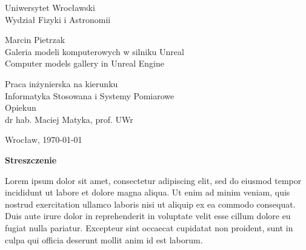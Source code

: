 \documentclass[a4paper,12pt,reqno]{article}
\begin{document}


\begin{center}

\thispagestyle{empty}

\Large 
Uniwersytet Wrocławski\\
Wydział Fizyki i Astronomii\\
\vspace{0.8cm}
\vspace{1.8cm}

\Large Marcin Pietrzak \\
\vspace{3.2cm}
\Large Galeria modeli komputerowych w silniku Unreal \\
\vspace{1.5cm}
Computer models gallery in Unreal Engine
\end{center}
\vspace{3.7cm}
\begin{flushright}

\large{ Praca inżynierska na kierunku \\Informatyka Stosowana i Systemy Pomiarowe \\}
\vspace{0.5cm}
\large{ Opiekun \\ dr hab. Maciej Matyka, prof. UWr}
\end{flushright}
\vspace{2.2cm}

\begin{center}
\large Wrocław, \today
\end{center}

\newpage

\tableofcontents

\newpage

\begin{flushleft}
\Large \textbf{Streszczenie}
\end{flushleft}
\vspace{1cm}


 Lorem ipsum dolor sit amet, consectetur adipiscing elit, sed do eiusmod tempor incididunt ut labore et dolore magna aliqua. Ut enim ad minim veniam, quis nostrud exercitation ullamco laboris nisi ut aliquip ex ea commodo consequat. Duis aute irure dolor in reprehenderit in voluptate velit esse cillum dolore eu fugiat nulla pariatur. Excepteur sint occaecat cupidatat non proident, sunt in culpa qui officia deserunt mollit anim id est laborum.
\end{document}
